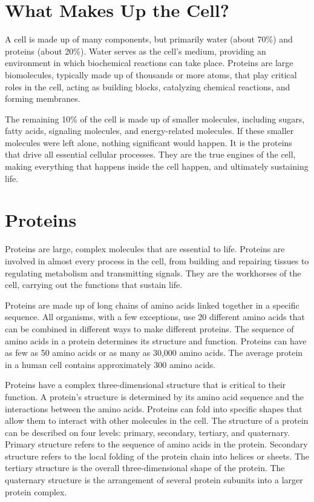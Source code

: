 \section{What Makes Up the Cell?}

A cell is made up of many components, but primarily water (about 70\%) and proteins (about 20\%). Water serves as the cell's medium, providing an environment in which biochemical reactions can take place. Proteins are large biomolecules, typically made up of thousands or more atoms, that play critical roles in the cell, acting as building blocks, catalyzing chemical reactions, and forming membranes.

The remaining 10\% of the cell is made up of smaller molecules, including sugars, fatty acids, signaling molecules, and energy-related molecules. If these smaller molecules were left alone, nothing significant would happen. It is the proteins that drive all essential cellular processes. They are the true engines of the cell, making everything that happens inside the cell happen, and ultimately sustaining life.

\section{Proteins}

Proteins are large, complex molecules that are essential to life. Proteins are involved in almost every process in the cell, from building and repairing tissues to regulating metabolism and transmitting signals. They are the workhorses of the cell, carrying out the functions that sustain life.

Proteins are made up of long chains of amino acids linked together in a specific sequence. All organisms, with a few exceptions, use 20 different amino acids that can be combined in different ways to make different proteins. The sequence of amino acids in a protein determines its structure and function. Proteins can have as few as 50 amino acids or as many as 30,000 amino acids. The average protein in a human cell contains approximately 300 amino acids.

Proteins have a complex three-dimensional structure that is critical to their function. A protein's structure is determined by its amino acid sequence and the interactions between the amino acids. Proteins can fold into specific shapes that allow them to interact with other molecules in the cell. The structure of a protein can be described on four levels: primary, secondary, tertiary, and quaternary. Primary structure refers to the sequence of amino acids in the protein. Secondary structure refers to the local folding of the protein chain into helices or sheets. The tertiary structure is the overall three-dimensional shape of the protein. The quaternary structure is the arrangement of several protein subunits into a larger protein complex.


